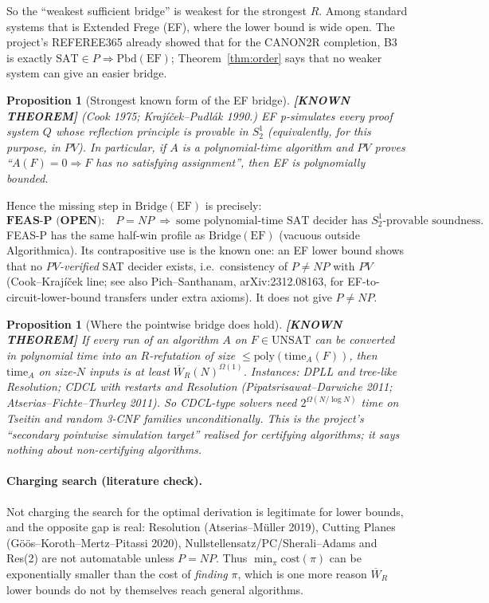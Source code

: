 \documentclass[11pt]{article}
\newtheorem{proposition}[theorem]{Proposition}
\theoremstyle{definition}
\theoremstyle{remark}
\newcommand{\SAT}{\mathrm{SAT}}
\newcommand{\UNSAT}{\mathrm{UNSAT}}
\newcommand{\Wb}{\overline W}
\newcommand{\Br}{\mathrm{Bridge}}
\newcommand{\Pbd}{\mathrm{Pbd}}
\newcommand{\status}[1]{\textbf{[#1]}}
\begin{document}
So the ``weakest sufficient bridge'' is weakest for the strongest $R$. Among standard systems that is
Extended Frege (EF), where the lower bound is wide open. The project's REFEREE365 already showed that
for the CANON2R completion, B3 is exactly $\SAT\in P\Rightarrow\Pbd(\mathrm{EF})$; Theorem~\ref{thm:order}
says that no weaker system can give an easier bridge.

\begin{proposition}[Strongest known form of the EF bridge]\status{KNOWN THEOREM}
(Cook 1975; Kraj\'i\v{c}ek--Pudl\'ak 1990.) EF p-simulates every proof system $Q$ whose reflection
principle is provable in $S^1_2$ (equivalently, for this purpose, in $PV$). In particular, if $A$ is a
polynomial-time algorithm and $PV$ proves ``$A(F)=0\Rightarrow F$ has no satisfying assignment'', then
EF is polynomially bounded.
\end{proposition}

Hence the missing step in $\Br(\mathrm{EF})$ is precisely:
\[
\textbf{FEAS-P (OPEN):}\quad P=NP\ \Longrightarrow\ \text{some polynomial-time SAT decider has }
S^1_2\text{-provable soundness.}
\]
FEAS-P has the same half-win profile as $\Br(\mathrm{EF})$ (vacuous outside Algorithmica). Its
contrapositive use is the known one: an EF lower bound shows that no \emph{$PV$-verified} SAT decider
exists, i.e.\ consistency of $P\ne NP$ with $PV$ (Cook--Kraj\'i\v{c}ek line; see also Pich--Santhanam,
arXiv:2312.08163, for EF-to-circuit-lower-bound transfers under extra axioms). It does not give
$P\ne NP$.

\begin{proposition}[Where the pointwise bridge does hold]\status{KNOWN THEOREM}
If every run of an algorithm $A$ on $F\in\UNSAT$ can be converted in polynomial time into an
$R$-refutation of size $\le\mathrm{poly}(\mathrm{time}_A(F))$, then
$\mathrm{time}_A$ on size-$N$ inputs is at least $\Wb_R(N)^{\Omega(1)}$. Instances: DPLL and
tree-like Resolution; CDCL with restarts and Resolution (Pipatsrisawat--Darwiche 2011;
Atserias--Fichte--Thurley 2011). So CDCL-type solvers need $2^{\Omega(N/\log N)}$ time on Tseitin and
random 3-CNF families unconditionally. This is the project's ``secondary pointwise simulation target''
realised for certifying algorithms; it says nothing about non-certifying algorithms.
\end{proposition}

\paragraph{Charging search (literature check).}
Not charging the search for the optimal derivation is legitimate for lower bounds, and the opposite gap is
real: Resolution (Atserias--M\"uller 2019), Cutting Planes (G\"o\"os--Koroth--Mertz--Pitassi 2020),
Nullstellensatz/PC/Sherali--Adams and Res(2) are not automatable unless $P=NP$. Thus
$\min_\pi\mathrm{cost}(\pi)$ can be exponentially smaller than the cost of \emph{finding} $\pi$, which is
one more reason $\Wb_R$ lower bounds do not by themselves reach general algorithms.
\end{document}
